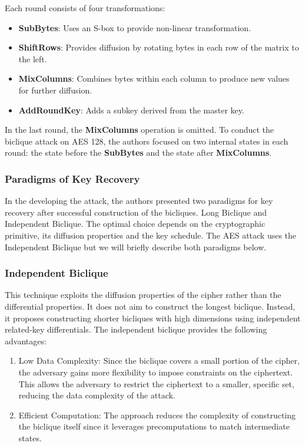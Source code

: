 \documentclass{report}
\begin{document}
Each round consists of four transformations:
\begin{itemize}
    \item \textbf{SubBytes}: Uses an S-box to provide non-linear transformation.
    \item \textbf{ShiftRows}: Provides diffusion by rotating bytes in each row of the matrix to the left.
    \item \textbf{MixColumns}: Combines bytes within each column to produce new values for further diffusion.
    \item \textbf{AddRoundKey}: Adds a subkey derived from the master key.
\end{itemize}

In the last round, the \textbf{MixColumns} operation is omitted. To conduct the biclique attack on AES 128, the authors \cite{bogdanov2011biclique} focused on two internal states in each round: the state before the \textbf{SubBytes} and the state after \textbf{MixColumns}.

 \subsubsection{Paradigms of Key Recovery}
 In the developing the attack, the authors\cite{bogdanov2011biclique} presented two paradigms for key recovery after successful construction of the bicliques. Long Biclique and Independent Biclique. The optimal choice depends on the cryptographic primitive, its diffusion properties and the key schedule. The AES attack uses the Independent Biclique but we will briefly describe both paradigms below.
 \subsubsection{Independent Biclique\cite{bogdanov2011biclique}}
 This technique exploits the diffusion properties of the cipher rather than the differential properties. It does not aim to construct the longest biclique. Instead, it proposes constructing shorter bicliques with high dimensions using independent related-key differentials. The independent biclique provides the following advantages:
 \begin{enumerate}
    \item Low Data Complexity: Since the biclique covers a small portion of the cipher, the adversary gains more flexibility to impose constraints on the ciphertext. This allows the adversary to restrict the ciphertext to a smaller, specific set, reducing the data complexity of the attack.
    \item Efficient Computation: The approach reduces the complexity of constructing the biclique itself since it leverages precomputations to match intermediate states.
 \end{enumerate}
\end{document}
